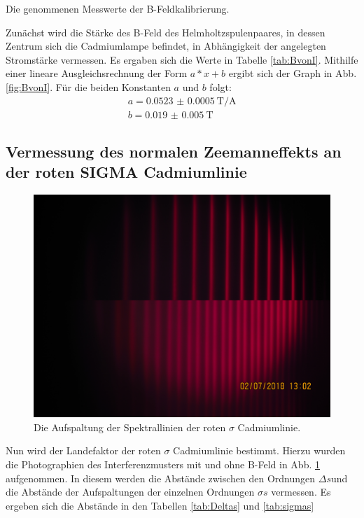 \begin{table}
	\centering
	\caption{Die genommenen Messwerte der B-Feldkalibrierung.}
	
	
	\label{tab:BvonI}
\end{table}

Zunächst wird die Stärke des B-Feld des Helmholtzspulenpaares, in dessen Zentrum sich die Cadmiumlampe befindet, in Abhängigkeit der angelegten Stromstärke vermessen. Es ergaben sich die Werte in Tabelle \ref{tab:BvonI}. Mithilfe einer lineare Ausgleichsrechnung der Form $a*x+b$ ergibt sich der Graph in Abb. \ref{fig:BvonI}. Für die beiden Konstanten $a$ und $b$ folgt: 
\begin{gather}
	a = \SI{0.0523(5)}{\tesla\per\ampere}\\%
	b = \SI{0.019(5)}{\tesla}
\end{gather}

\subsection{Vermessung des normalen Zeemanneffekts an der roten SIGMA Cadmiumlinie}

\begin{figure}
	\centering
	\includegraphics[width=\linewidth-70pt,height=\textheight-70pt,keepaspectratio]{./content/Images/normalb0und1.JPG}
	\caption{Die Aufspaltung der Spektrallinien der roten $\sigma$ Cadmiumlinie.}
	\label{fig:normal}
\end{figure}

Nun wird der Landefaktor der roten $\sigma$ Cadmiumlinie bestimmt. Hierzu wurden die Photographien des Interferenzmusters mit und ohne B-Feld in Abb. \ref{fig:normal} aufgenommen. In diesem werden die Abstände zwischen den Ordnungen $\Delta s$und die Abstände der Aufspaltungen der einzelnen Ordnungen $\sigma s$ vermessen. Es ergeben sich die Abstände in den Tabellen \ref{tab:Deltas} und \ref{tab:sigmas}

